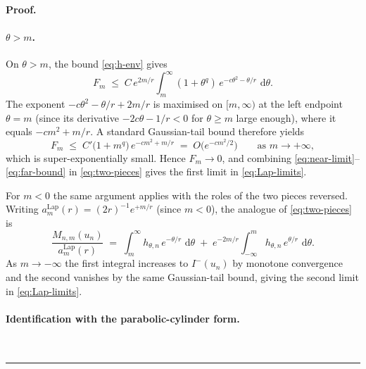 \documentclass{article}%
\newenvironment{proof}[1][Proof]{\noindent\textbf{#1.} }{\ \rule{0.5em}{0.5em}}
\newcommand{\dd}{\,\mathrm{d}}
\newcommand{\Lap}{\mathrm{Lap}}
\newcommand{\1}{\mathbf{1}}
\begin{document}
\begin{proof}
\begin{enumerate}
\paragraph{$\theta > m$.} \quad
On $\theta > m$, the bound \eqref{eq:h-env} gives
\[
  F_m \;\leq\; C\,e^{2m/r}\!\int_m^\infty (1+\theta^q)\,
  e^{-c\theta^2-\theta/r}\,\dd\theta.
\]
The exponent $-c\theta^2-\theta/r+2m/r$ is maximised on $[m,\infty)$ at
the left endpoint $\theta = m$ (since its derivative
$-2c\theta - 1/r < 0$ for $\theta\geq m$ large enough), where it equals
$-cm^2+m/r$. A standard Gaussian-tail bound therefore yields
\begin{equation}\label{eq:far-bound}
  F_m \;\leq\; C'\bigl(1+m^q\bigr)\,e^{-cm^2+m/r}
  \;=\; O\!\bigl(e^{-cm^2/2}\bigr)
  \qquad\text{as }m\to+\infty,
\end{equation}
which is super-exponentially small. Hence $F_m\to 0$, and combining
\eqref{eq:near-limit}--\eqref{eq:far-bound} in \eqref{eq:two-pieces}
gives the first limit in \eqref{eq:Lap-limits}.

For $m<0$ the same argument applies with the roles of the two pieces reversed. Writing $a_m^{\Lap}(r) = (2r)^{-1}e^{+m/r}$ (since $m<0$),
the analogue of \eqref{eq:two-pieces} is
\[
  \frac{M_{n,m}(u_n)}{a_m^{\Lap}(r)}
  \;=\;\int_m^\infty h_{\theta,n}\,e^{-\theta/r}\,\dd\theta
  \;+\;e^{-2m/r}\int_{-\infty}^m h_{\theta,n}\,e^{\theta/r}\,\dd\theta.
\]
As $m\to-\infty$ the first integral increases to $I^-(u_n)$ by monotone
convergence and the second vanishes by the same Gaussian-tail bound,
giving the second limit in \eqref{eq:Lap-limits}.

\paragraph{Identification with the parabolic-cylinder form.} 


\end{enumerate}
\end{proof}
\end{document}
